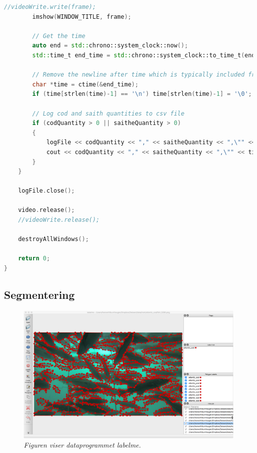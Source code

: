 \begin{lstlisting}[language=C++, caption=main.cpp]
        //videoWrite.write(frame);
        imshow(WINDOW_TITLE, frame);

        // Get the time
        auto end = std::chrono::system_clock::now();
        std::time_t end_time = std::chrono::system_clock::to_time_t(end);

        // Remove the newline after time which is typically included from the C library call
        char *time = ctime(&end_time);
        if (time[strlen(time)-1] == '\n') time[strlen(time)-1] = '\0';

        // Log cod and saith quantities to csv file
        if (codQuantity > 0 || saitheQuantity > 0)
        {
            logFile << codQuantity << "," << saitheQuantity << ",\"" << time << "\"" << endl;
            cout << codQuantity << "," << saitheQuantity << ",\"" << time << "\"" << endl;
        }
    }

    logFile.close();

    video.release();
    //videoWrite.release();

    destroyAllWindows();

    return 0;
}
\end{lstlisting}


\subsection{Segmentering}

\begin{figure}[h!]
\begin{center} 
\includegraphics[scale=0.25]{figures/labelme}
\caption{\small \sl Figuren viser dataprogrammet labelme. \cite{Wada 2016} \label{fig:labelme}} 
\end{center} 
\end{figure} 
